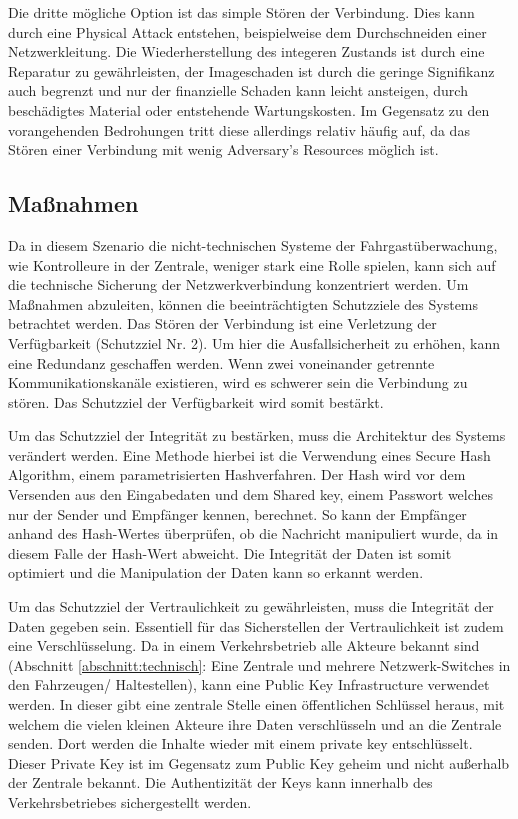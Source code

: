 Die dritte mögliche Option ist das simple Stören der Verbindung. Dies kann durch eine \glqq{}Physical Attack\grqq{} entstehen, beispielweise dem Durchschneiden einer Netzwerkleitung. Die Wiederherstellung des
integeren Zustands ist durch eine Reparatur zu gewährleisten, der Imageschaden ist durch die geringe Signifikanz auch begrenzt und nur der finanzielle Schaden kann leicht ansteigen, durch beschädigtes Material
oder entstehende Wartungskosten. Im Gegensatz zu den vorangehenden Bedrohungen tritt diese allerdings relativ häufig auf, da das Stören einer Verbindung mit wenig \glqq{}Adversary's Resources\grqq{} möglich ist.

\subsection{Maßnahmen}
Da in diesem Szenario die nicht-technischen Systeme der Fahrgastüberwachung, wie Kontrolleure in der Zentrale, weniger stark eine Rolle spielen, kann sich auf die technische Sicherung der Netzwerkverbindung konzentriert werden.
Um Maßnahmen abzuleiten, können die beeinträchtigten Schutzziele des Systems betrachtet werden. Das Stören der Verbindung ist eine Verletzung der Verfügbarkeit (Schutzziel Nr. 2). Um hier die Ausfallsicherheit
zu erhöhen, kann eine Redundanz geschaffen werden. Wenn zwei voneinander getrennte Kommunikationskanäle existieren, wird es schwerer sein
die Verbindung zu stören. Das Schutzziel der Verfügbarkeit wird somit bestärkt.

Um das Schutzziel der Integrität zu bestärken, muss die Architektur des Systems verändert werden. Eine Methode hierbei ist die Verwendung eines \glqq{}Secure Hash Algorithm\grqq{}, einem parametrisierten Hashverfahren.
Der Hash wird vor dem Versenden aus den Eingabedaten und dem Shared key, einem Passwort welches nur der Sender und Empfänger kennen, berechnet. So kann der Empfänger anhand des Hash-Wertes überprüfen,
ob die Nachricht manipuliert wurde, da in diesem Falle der Hash-Wert abweicht. Die Integrität der Daten ist somit optimiert und die Manipulation der Daten kann so erkannt werden.

Um das Schutzziel der Vertraulichkeit zu gewährleisten, muss die Integrität der Daten gegeben sein. Essentiell für das Sicherstellen der Vertraulichkeit ist zudem eine Verschlüsselung. Da in einem Verkehrsbetrieb alle Akteure
bekannt sind (Abschnitt \ref{abschnitt:technisch}: Eine Zentrale und mehrere Netzwerk-Switches in den Fahrzeugen/ Haltestellen), kann eine \glqq{}Public Key Infrastructure\grqq{} verwendet werden. In dieser gibt
eine zentrale Stelle einen öffentlichen Schlüssel heraus, mit welchem die vielen kleinen Akteure ihre Daten verschlüsseln und an die Zentrale senden. Dort werden die Inhalte wieder mit einem private key entschlüsselt.
Dieser Private Key ist im Gegensatz zum Public Key geheim und nicht außerhalb der Zentrale bekannt. Die Authentizität der Keys kann innerhalb des Verkehrsbetriebes sichergestellt werden.